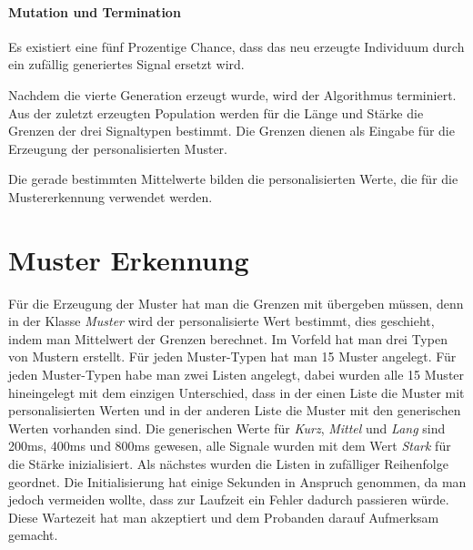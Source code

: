 \paragraph{Mutation und Termination}
Es existiert eine f{\"u}nf Prozentige Chance, dass das neu erzeugte Individuum durch ein zuf{\"a}llig generiertes Signal ersetzt wird. 

Nachdem die vierte Generation erzeugt wurde, wird der Algorithmus terminiert. Aus der zuletzt erzeugten Population werden f{\"u}r die L{\"a}nge und St{\"a}rke die Grenzen der drei Signaltypen bestimmt. Die Grenzen dienen als Eingabe f{\"u}r die Erzeugung der personalisierten Muster. 


Die gerade bestimmten Mittelwerte bilden die personalisierten Werte, die f{\"u}r die Mustererkennung verwendet werden. 

\section {Muster Erkennung}


F{\"u}r die Erzeugung der Muster hat man die Grenzen mit {\"u}bergeben m{\"u}ssen, denn in der Klasse \textit{Muster} wird der personalisierte Wert bestimmt, dies geschieht, indem man Mittelwert der Grenzen berechnet. 
Im Vorfeld hat man drei Typen von Mustern erstellt. F{\"u}r jeden Muster-Typen hat man 15 Muster angelegt. 
F{\"u}r jeden Muster-Typen habe man zwei Listen angelegt, dabei wurden alle 15 Muster hineingelegt mit dem einzigen Unterschied, dass in der einen Liste die Muster mit personalisierten Werten und in der anderen Liste die Muster mit den generischen Werten vorhanden sind.
Die generischen Werte f{\"u}r \textit{Kurz}, \textit{Mittel} und \textit{Lang} sind 200ms, 400ms und 800ms gewesen, alle Signale wurden mit dem Wert \textit{Stark} f{\"u}r die St{\"a}rke inizialisiert.
Als n{\"a}chstes wurden die Listen in zuf{\"a}lliger Reihenfolge geordnet. 
Die Initialisierung hat einige Sekunden in Anspruch genommen, da man jedoch vermeiden wollte, dass zur Laufzeit ein Fehler dadurch passieren w{\"u}rde. Diese Wartezeit hat man akzeptiert und dem Probanden darauf Aufmerksam gemacht.

